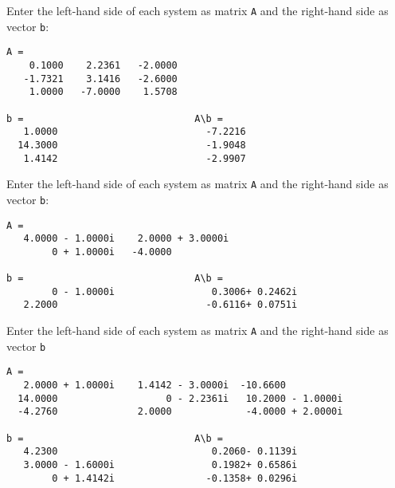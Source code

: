 \documentclass{ximera}
\begin{document}
Enter the left-hand side of each system as matrix {\tt A} 
and the right-hand side as vector {\tt b}:

\begin{verbatim}
A =                           
    0.1000    2.2361   -2.0000
   -1.7321    3.1416   -2.6000
    1.0000   -7.0000    1.5708

b =                              A\b =
   1.0000                          -7.2216
  14.3000                          -1.9048
   1.4142                          -2.9907
\end{verbatim}

Enter the left-hand side of each system as matrix {\tt A} 
and the right-hand side as vector {\tt b}:

\begin{verbatim}
A =
   4.0000 - 1.0000i    2.0000 + 3.0000i
        0 + 1.0000i   -4.0000          

b =                              A\b =
        0 - 1.0000i                 0.3006+ 0.2462i
   2.2000                          -0.6116+ 0.0751i
\end{verbatim}

Enter the left-hand side of each system as matrix {\tt A} 
and the right-hand side as vector {\tt b}

\begin{verbatim}
A =
   2.0000 + 1.0000i    1.4142 - 3.0000i  -10.6600
  14.0000                   0 - 2.2361i   10.2000 - 1.0000i
  -4.2760              2.0000             -4.0000 + 2.0000i

b =                              A\b =
   4.2300                           0.2060- 0.1139i
   3.0000 - 1.6000i                 0.1982+ 0.6586i
        0 + 1.4142i                -0.1358+ 0.0296i
\end{verbatim}
\end{document}

